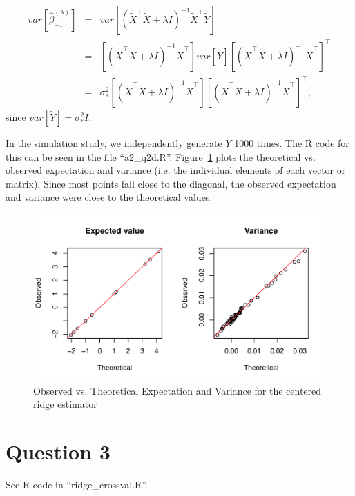 \documentclass{article}\usepackage[]{graphicx}\usepackage[]{color}
\makeatletter
\def\maxwidth{ %
  \ifdim\Gin@nat@width>\linewidth
    \linewidth
  \else
    \Gin@nat@width
  \fi
}
\newenvironment{knitrout}{}{} %
\makeatother
\begin{document}
\begin{eqnarray*}
  var[\hat{\beta}^{(\lambda)}_{-1}] &=& var[(\tilde{X}^\top\tilde{X}+\lambda I)^{-1}\tilde{X}^\top\tilde{Y}] \\
            &=& [(\tilde{X}^\top\tilde{X}+\lambda I)^{-1}\tilde{X}^\top] var[\tilde{Y}] [(\tilde{X}^\top\tilde{X}+\lambda I)^{-1}\tilde{X}^\top]^\top \\
            &=& \sigma^2_* [(\tilde{X}^\top\tilde{X}+\lambda I)^{-1}\tilde{X}^\top ] [(\tilde{X}^\top\tilde{X}+\lambda I)^{-1}\tilde{X}^\top]^\top,
\end{eqnarray*}
since $var[\tilde{Y}]=\sigma^2_* I$.

\vspace{0.5in}

In the simulation study, we independently generate $Y$ 1000 times.  The R code for this can be seen in the file ``a2\_q2d.R''. Figure~\ref{fig:q2_graphs} plots the theoretical vs. observed expectation and variance (i.e. the individual elements of each vector or matrix).  Since most points fall close to the diagonal, the observed expectation and variance were close to the theoretical values.


\begin{knitrout}
\color{fgcolor}\begin{figure}
\includegraphics[width=\maxwidth]{figure/q2_graphs-1} \caption[Observed vs]{Observed vs. Theoretical Expectation and Variance for the centered ridge estimator}\label{fig:q2_graphs}
\end{figure}


\end{knitrout}


\section*{Question 3}
See R code in ``ridge\_crossval.R''.
\end{document}
